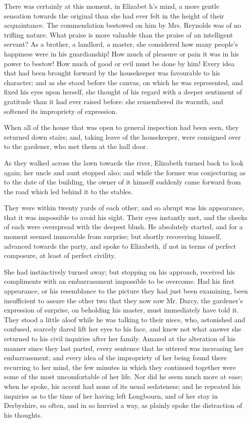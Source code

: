 \documentclass[10pt]{book}
\begin{document}
   There was certainly at this moment, in Elizabet
   h’s mind, a more gentle
sensation towards the original than she had ever felt in the height of
their acquaintance. The commendation bestowed on him by Mrs. Reynolds
was of no trifling nature. What praise is more valuable than the praise
of an intelligent servant? As a brother, a landlord, a master, she
considered how many people’s happiness were in his guardianship! How
much of pleasure or pain it was in his power to bestow! How much of good
or evil must be done by him! Every idea that had been brought forward by
the housekeeper was favourable to his character; and as she stood before
the canvas, on which he was represented, and fixed his eyes upon
herself, she thought of his regard with a deeper sentiment of gratitude
than it had ever raised before: she remembered its warmth, and softened
its impropriety of expression.
  

   When all of the house that was open to general inspection had been seen,
they returned down stairs; and, taking leave of the housekeeper, were
consigned over to the gardener, who met them at the hall door.
  

   As they walked across the lawn towards the river, Elizabeth turned back
to look again; her uncle and aunt stopped also; and while the former was
conjecturing as to the date of the building, the owner of it himself
suddenly came forward from the road which led behind it to the stables.
  

   They were within twenty yards of each other; and so abrupt was his
appearance, that it was impossible to avoid his sight. Their eyes
instantly met, and the cheeks of each were overspread with the deepest
blush. He absolutely started, and for a moment seemed immovable from
surprise; but shortly recovering himself, advanced towards the party,
and spoke to Elizabeth,
   if not in terms of perfect composure, at least
of perfect civility.
  

   She had instinctively turned away; but stopping on his approach,
received his compliments with an embarrassment impossible to be
overcome. Had his first appearance, or his resemblance to the picture
they had just been examining, been insufficient to assure the other two
that they now saw Mr. Darcy, the gardener’s expression of surprise, on
beholding his master, must immediately have told it. They stood a little
aloof while he was talking to their niece, who, astonished and confused,
scarcely dared lift her eyes to his face, and knew not what answer she
returned to his civil inquiries after her family. Amazed at the
alteration of his manner since they last parted, every sentence that he
uttered was increasing her embarrassment; and every idea of the
impropriety of her being found there recurring to her mind, the few
minutes in which they continued together were some of the most
uncomfortable of her life. Nor did he seem much more at ease; when he
spoke, his accent had none of its usual sedateness; and he repeated his
inquiries as to the time of her having left Longbourn, and of her stay
in Derbyshire, so often, and in so hurried a way, as plainly spoke the
distraction of his thoughts.
  
\end{document}
